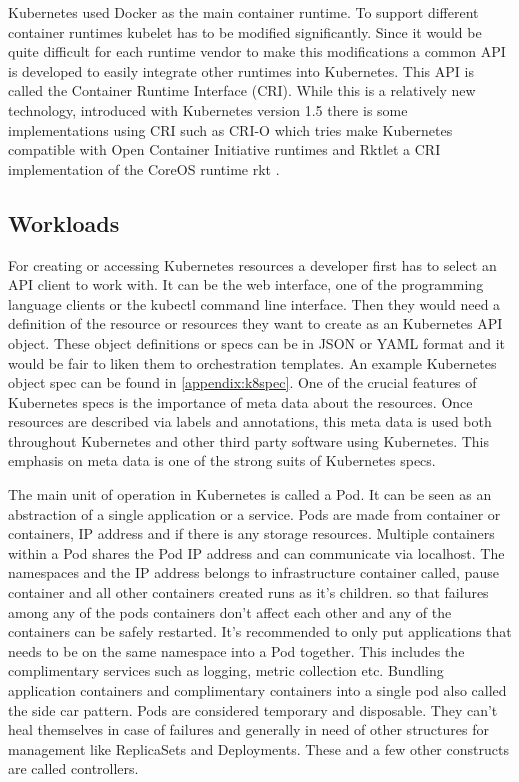 \documentclass[12pt,oneandhalf,chaparabic,ceng,ms,eng,oneside,pntc]{gsufbe}
\begin{document}
Kubernetes used Docker as the main container runtime.  To support different container runtimes kubelet
has to be modified significantly.  Since it would be quite difficult for each runtime vendor to make
this modifications a common API is developed to easily integrate other runtimes into Kubernetes.  This
API is called the Container Runtime Interface (CRI).  While this is a relatively new technology,
introduced with Kubernetes version 1.5 there is some implementations using CRI such as CRI-O \cite{crio} which
tries make Kubernetes compatible with Open Container Initiative runtimes and Rktlet a CRI
implementation of the CoreOS runtime rkt \cite{rkt}.

\subsection{Workloads}
For creating or accessing Kubernetes resources a developer first has to select an API client to work
with.  It can be the web interface, one of the programming language clients or the kubectl command line
interface.  Then they would need a definition of the resource or resources they want to create as an
Kubernetes API object.  These object definitions or specs can be in JSON or YAML format and it would be
fair to liken them to orchestration templates.  An example Kubernetes object spec can be found in
\ref{appendix:k8spec}.  One of the crucial features of Kubernetes specs is the importance of meta data
about the resources.
Once resources are described via labels and annotations, this meta data is used both throughout 
Kubernetes and other third party software using Kubernetes. This emphasis on meta data is one of the strong
suits of Kubernetes specs.

The main unit of operation in Kubernetes is called a Pod.  It can be seen as an abstraction of a single
application or a service.  Pods are made from container or containers, IP address and if there is any
storage resources.  Multiple containers within a Pod shares the Pod IP address and can communicate via
localhost.  The namespaces and the IP address belongs to infrastructure container called, pause 
container and all other containers created runs as it’s children.  so that failures among any of the 
pods containers don't affect each other and any of the containers can be safely restarted.  
\cite{sayfan_mastering_2018} It's 
recommended to only put applications that needs to be on the same namespace into a Pod together.  This
includes the complimentary services such as logging, metric collection etc. Bundling application
containers and complimentary containers into a single pod also called the side car pattern.  Pods are
considered temporary and disposable.  They can’t heal themselves in case of failures and generally in
need of other structures for management like ReplicaSets and Deployments.  These and a few other
constructs are called controllers.
\end{document}
